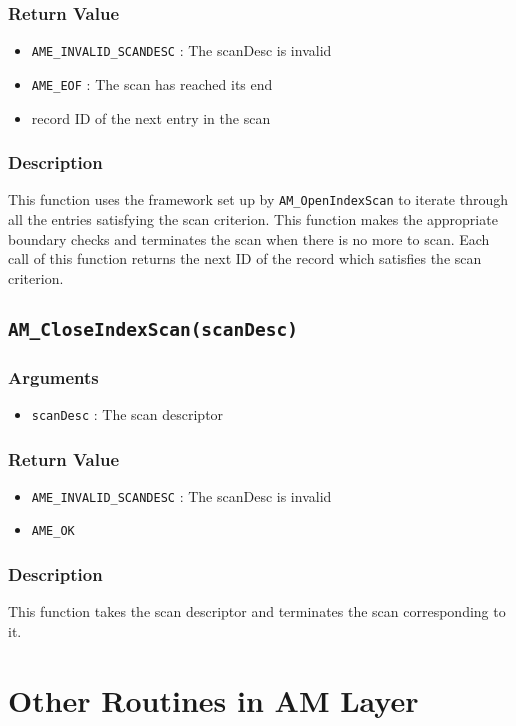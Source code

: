 \documentclass[a4paper, 12pt]{article}
\begin{document}
\subsubsection{Return Value}
\begin{itemize}
	\item{\texttt{AME\_INVALID\_SCANDESC} : The scanDesc is invalid}
	\item{\texttt{AME\_EOF} : The scan has reached its end}
	\item{record ID of the next entry in the scan}
\end{itemize}
\subsubsection{Description}
This function uses the framework set up by \texttt{AM\_OpenIndexScan} to iterate through all the entries satisfying the scan criterion. This function makes the appropriate boundary checks and terminates the scan when there is no more to scan. Each call of this function returns the next ID of the record which satisfies the scan criterion.

\subsection{\texttt{AM\_CloseIndexScan(scanDesc)}}
\subsubsection{Arguments}
\begin{itemize}
	\item{\texttt{scanDesc} : The scan descriptor}
\end{itemize}
\subsubsection{Return Value}
\begin{itemize}
	\item{\texttt{AME\_INVALID\_SCANDESC} : The scanDesc is invalid}
	\item{\texttt{AME\_OK}}
\end{itemize}
\subsubsection{Description}
This function takes the scan descriptor and terminates the scan corresponding to it.


\section{Other Routines in AM Layer}
\end{document}
